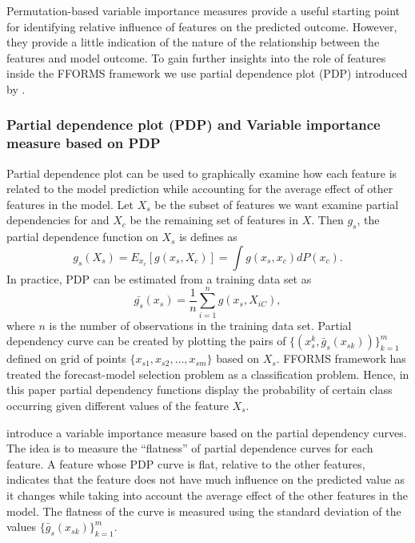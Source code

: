 \documentclass[11pt,a4paper,]{article}
\begin{document}
Permutation-based variable importance measures provide a useful starting point for identifying relative influence of features on the predicted outcome. However, they provide a little indication of the nature of the relationship between the features and model outcome. To gain further insights into the role of features inside the FFORMS framework we use partial dependence plot (PDP) introduced by \textcite{friedman2008predictive}.

\hypertarget{partial-dependence-plot-pdp-and-variable-importance-measure-based-on-pdp}{%
\subsubsection{Partial dependence plot (PDP) and Variable importance measure based on PDP}\label{partial-dependence-plot-pdp-and-variable-importance-measure-based-on-pdp}}

Partial dependence plot can be used to graphically examine how each feature is related to the model prediction while accounting for the average effect of other features in the model. Let \(X_s\) be the subset of features we want examine partial dependencies for and \(X_c\) be the remaining set of features in \(X\). Then \(g_s\), the partial dependence function on \(X_s\) is defines as
\[g_s(X_s)=E_{x_c}[g(x_s, X_c)]=\int{g(x_s, x_c)dP(x_c).}\]
In practice, PDP can be estimated from a training data set as
\[\bar{g_s}(x_s)=\frac{1}{n}\sum_{i=1}^{n}g(x_s, X_{iC}),\]
where \(n\) is the number of observations in the training data set. Partial dependency curve can be created by plotting the pairs of \(\{(x_s^k, \bar{g}_s(x_{sk}))\}_{k=1}^{m}\) defined on grid of points \(\{x_{s1}, x_{s2},\dots, x_{sm}\}\) based on \(X_s\). FFORMS framework has treated the forecast-model selection problem as a classification problem. Hence, in this paper partial dependency functions display the probability of certain class occurring given different values of the feature \(X_s\).

\textcite{Greenwell2018} introduce a variable importance measure based on the partial dependency curves. The idea is to measure the ``flatness'' of partial dependence curves for each feature. A feature whose PDP curve is flat, relative to the other features, indicates that the feature does not have much influence on the predicted value as it changes while taking into account the average effect of the other features in the model. The flatness of the curve is measured using the standard deviation of the values \(\{\bar{g}_{s}(x_{sk})\}_{k=1}^{m}\).
\end{document}
